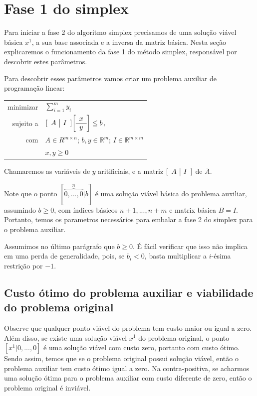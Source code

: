 \documentclass[12pt]{article}
\begin{document}
    
\newpage
\section{Fase 1 do simplex}
	Para iniciar a fase 2 do algoritmo simplex precisamos de uma solução viável básica $x^1$, a sua base associada e a inversa da matriz básica. Nesta seção explicaremos o funcionamento da fase 1 do método simplex, responsável por descobrir estes parâmetros.

Para descobrir esses parâmetros vamos criar um problema auxiliar de programação linear:

\begin{center}
	\begin{tabular}{r l}
		minimizar & $\sum_{i = 1}^{m} y_i$ \\
		sujeito a & $
					[\begin{array}{c | c}
						A & I
					\end{array}]
					
					\bigg[\begin{array}{c}
						x \\
						\hline
						y
					\end{array}\bigg]
					
					\leq b$, \\
			com   &	$A \in R^{m \times n}$; $b, y \in \mathbb{R}^m$; $I \in \mathbb{R}^{m \times m}$ \\
            & $x, y \geq 0$
	\end{tabular}
\end{center}
Chamaremos as variáveis de $y$ aritificiais, e a matriz $[\begin{array}{c | c} A & I	\end{array}]$ de $\overline{A}$.

Note que o ponto $[\overbrace{0, ..., 0}^{n}|b]$ é uma solução viável básica do problema auxiliar, assumindo $b \geq 0$, com índices básicos $n + 1, ..., n + m$ e matrix básica $B = I$. Portanto, temos os parametros necessários para embalar a fase 2 do simplex para o problema auxiliar.

Assumimos no último parágrafo que $b \geq 0$. É fácil verificar que isso não implica em uma perda de generalidade, pois, se $b_i < 0$, basta multiplicar a $i$-ésima restrição por $-1$.



\subsection{Custo ótimo do problema auxiliar e viabilidade do problema original}
\label{fase2:custo_otimo}
Observe que qualquer ponto viável do problema tem custo maior ou igual a zero. Além disso, se existe uma solução viável $x^1$ do problema original, o ponto $[x^1 | 0, ..., 0]$ é uma solução viável com custo zero, portanto com custo ótimo. Sendo assim, temos que se o problema original possui solução viável, então o problema auxiliar tem custo ótimo igual a zero. Na contra-positiva, se acharmos uma solução ótima para o problema auxiliar com custo diferente de zero, então o problema original é inviável.
\end{document}
